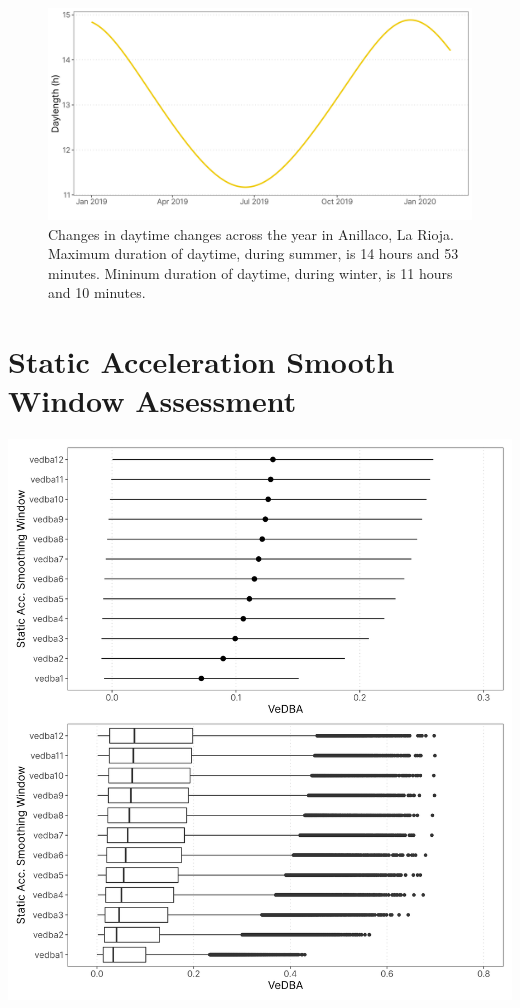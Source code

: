 \documentclass[english,msc,numbers,hidelinks]{coppe}
\begin{document}
  \begin{figure}

  {\centering \includegraphics[width=1\linewidth]{../04_figures/appendix/plot_daylength} 

  }

  \caption{Changes in daytime changes across the year in Anillaco, La Rioja. Maximum duration of daytime, during summer, is 14 hours and 53 minutes. Mininum duration of daytime, during winter, is 11 hours and 10 minutes.}\label{fig:appendix-daylenght}
  \end{figure}
  \hypertarget{static-acceleration-smooth-window-assessment}{%
  \chapter{Static Acceleration Smooth Window Assessment}\label{static-acceleration-smooth-window-assessment}}
  \begin{center}\includegraphics[width=1\linewidth]{../04_figures/appendix/plot_smoothing_window} \end{center}
\end{document}
